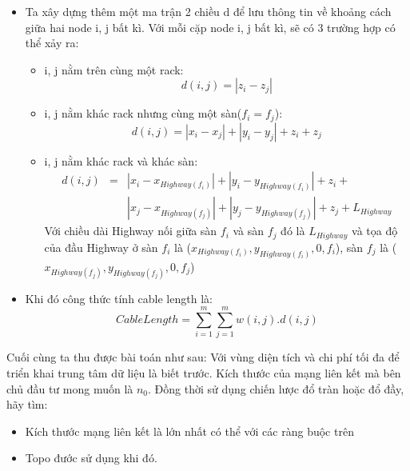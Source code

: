\documentclass[../report.tex]{subfiles}
\begin{document}
\begin{itemize}
    \item Ta xây dựng thêm một ma trận 2 chiều d để lưu thông tin về khoảng cách giữa hai node i, j bất kì. Với mỗi cặp node i, j bất kì, sẽ có 3 trường hợp có thể xảy ra:
        \begin{itemize}
            \item i, j nằm trên cùng một rack:
                \begin{equation}
                    d(i, j) = |z_i - z_j|
                \end{equation}
            \item i, j nằm khác rack nhưng cùng một sàn($f_i = f_j$): 
                \begin{equation}
                    d(i, j) = |x_i - x_j| + |y_i - y_j| + z_i + z_j
                \end{equation}
            \item i, j nằm khác rack và khác sàn:
                \begin{eqnarray*}
                    d(i, j) & =  & |x_i - x_{Highway(f_i)}| + |y_i - y_{Highway(f_i)}| + z_i + \\
                    &    & |x_j - x_{Highway(f_j)}| + |y_j - y_{Highway(f_j)}| + z_j + L_{Highway}	 
                \end{eqnarray*}
                Với chiều dài Highway nối giữa sàn $f_i$ và sàn $f_j$ đó là $L_{Highway}$ và tọa độ của đầu Highway ở sàn $f_i$ là ($x_{Highway(f_i)}, y_{Highway(f_i)}, 0, f_i$), sàn $f_j$ là ($x_{Highway(f_j)}, y_{Highway(f_j)}, 0, f_j$)
        \end{itemize}

    \item Khi đó công thức tính cable length là:
        \begin{equation} \label{cb}
            Cable Length = \sum_{i = 1}^m\sum_{j = 1}^mw(i,j).d(i, j)
        \end{equation}
\end{itemize}
Cuối cùng ta thu được bài toán như sau: Với vùng diện tích và chi phí tối đa để triển khai trung tâm dữ liệu là biết trước. Kích thước của mạng liên kết mà bên chủ đầu tư mong muốn là $n_0$. Đồng thời sử dụng chiến lược đổ tràn hoặc đổ đầy, hãy tìm:
\begin{itemize}
    \item Kích thước mạng liên kết là lớn nhất có thể với các ràng buộc trên
    \item Topo đước sử dụng khi đó.
\end{itemize}
\end{document}
